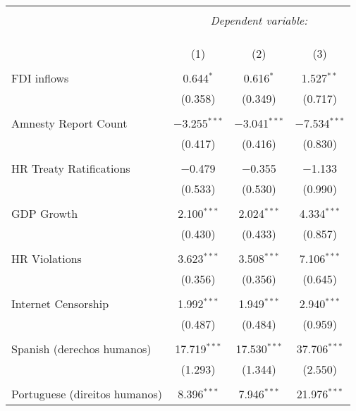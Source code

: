 
\begin{table}[!htbp] \centering 
  \caption{} 
  \label{} 
\begin{tabular}{@{\extracolsep{5pt}}lccc} 
\\[-1.8ex]\hline 
\hline \\[-1.8ex] 
 & \multicolumn{3}{c}{\textit{Dependent variable:}} \\ 
\cline{2-4} 
\\[-1.8ex] & \multicolumn{3}{c}{ } \\ 
\\[-1.8ex] & (1) & (2) & (3)\\ 
\hline \\[-1.8ex] 
 FDI inflows & 0.644$^{*}$ & 0.616$^{*}$ & 1.527$^{**}$ \\ 
  & (0.358) & (0.349) & (0.717) \\ 
  & & & \\ 
 Amnesty Report Count & $-$3.255$^{***}$ & $-$3.041$^{***}$ & $-$7.534$^{***}$ \\ 
  & (0.417) & (0.416) & (0.830) \\ 
  & & & \\ 
 HR Treaty Ratifications & $-$0.479 & $-$0.355 & $-$1.133 \\ 
  & (0.533) & (0.530) & (0.990) \\ 
  & & & \\ 
 GDP Growth & 2.100$^{***}$ & 2.024$^{***}$ & 4.334$^{***}$ \\ 
  & (0.430) & (0.433) & (0.857) \\ 
  & & & \\ 
 HR Violations & 3.623$^{***}$ & 3.508$^{***}$ & 7.106$^{***}$ \\ 
  & (0.356) & (0.356) & (0.645) \\ 
  & & & \\ 
 Internet Censorship & 1.992$^{***}$ & 1.949$^{***}$ & 2.940$^{***}$ \\ 
  & (0.487) & (0.484) & (0.959) \\ 
  & & & \\ 
 Spanish (derechos humanos) & 17.719$^{***}$ & 17.530$^{***}$ & 37.706$^{***}$ \\ 
  & (1.293) & (1.344) & (2.550) \\ 
  & & & \\ 
 Portuguese (direitos humanos) & 8.396$^{***}$ & 7.946$^{***}$ & 21.976$^{***}$ \\ 

\end{tabular}
\end{table}

